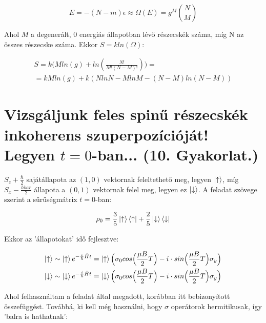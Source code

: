\documentclass[a4paper,12pt]{article}
\begin{document}
\begin{equation*}
E = -(N-m)\epsilon \approx \Omega(E) = g^{M}\binom N M
\end{equation*}

\par Ahol $M$ a degenerált, $0$ energiás állapotban lévő részecskék száma, míg N az összes részecske száma. Ekkor $S = kln(\Omega)$:

\begin{equation}
\begin{gathered}
S = k\Big(Mln(g) + ln(\frac{N!}{M!(N-M)!})\Big) = \\
= kMln(g) + k(NlnN - MlnM - (N-M)ln(N-M))
\end{gathered}
\end{equation}

\section{Vizsgáljunk feles spinű részecskék inkoherens szuperpozícióját! Legyen $t=0$-ban... (10. Gyakorlat.)}

\par $S_{z} +\frac{\hbar}{2}$ sajátállapota az $(1,0)$ vektornak feleltethető meg, legyen $\ket{\uparrow}$, míg $S_{x} -\frac{hbar}{2}$ állapota a $(0,1)$ vektornak felel meg, legyen ez $\ket{\downarrow}$. A feladat szövege szerint a sűrűségmátrix $t=0$-ban:

\begin{equation*}
\rho_{0} = \frac{3}{5}\ket{\uparrow}\bra{\uparrow} + \frac{2}{5}\ket{\downarrow}\bra{\downarrow}
\end{equation*}

\par Ekkor az 'állapotokat' idő fejlesztve:

\begin{equation*}
\begin{gathered}
\ket{\uparrow} \sim \ket{\uparrow}e^{-\frac{i}{\hbar}\hat{H}t} = \ket{\uparrow}\Big(\sigma_{0}cos\Big(\frac{\mu B}{2} T\Big) - i\cdot sin\Big(\frac{\mu B}{2}T\Big)\sigma_{y}\Big) \\
\ket{\downarrow} \sim \ket{\downarrow}e^{-\frac{i}{\hbar}\hat{H}t} = \ket{\downarrow}\Big(\sigma_{0}cos\Big(\frac{\mu B}{2} T\Big) - i\cdot sin\Big(\frac{\mu B}{2}T\Big)\sigma_{y}\Big)
\end{gathered}
\end{equation*}

\par Ahol felhasználtam a feladat által megadott, korábban itt bebizonyított összefüggést. Továbbá, ki kell még használni, hogy $\sigma$ operátorok hermitikusak, így 'balra is hathatnak':
\end{document}
